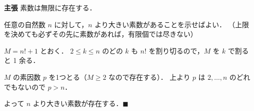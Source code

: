 \textbf{主張} 素数は無限に存在する．

任意の自然数 $n$ に対して，$n$ より大きい素数があることを示せばよい．
（上限を決めても必ずその先に素数があれば，有限個では尽きない）

$M = n! + 1$ とおく．
$2 \le k \le n$ のどの $k$ も $n!$ を割り切るので，$M$ を $k$ で割ると 1 余る．

$M$ の素因数 $p$ を1つとる（$M \ge 2$ なので存在する）．
上より $p$ は $2, \dots, n$ のどれでもないので $p > n$．

よって $n$ より大きい素数が存在する．$\blacksquare$
